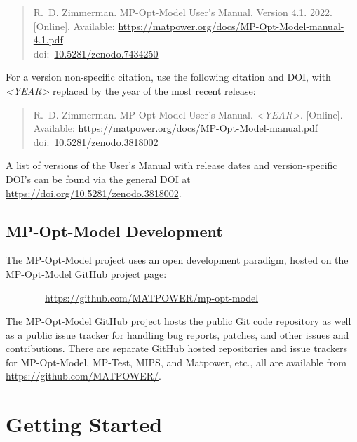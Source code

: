 \documentclass[12pt]{article}
\newcommand{\matpower}[0]{{\sc Matpower}}
\newcommand{\mptest}[0]{{MP-Test}}
\newcommand{\mips}[0]{{MIPS}}
\newcommand{\mpom}[0]{\mbox{MP-Opt-Model}}
\newcommand{\mpomurl}[0]{https://github.com/MATPOWER/mp-opt-model}
\newcommand{\mpomname}[0]{\mpom{}}
\newcommand{\doi}[1]{doi:~\href{https://doi.org/#1}{#1}}
\numberwithin{equation}{section}
\numberwithin{table}{section}
\numberwithin{figure}{section}
\begin{document}
\begin{quote}
\footnotesize
R.~D. Zimmerman. \mpomname{} User's Manual, Version 4.1. 2022. [Online]. Available: \url{https://matpower.org/docs/MP-Opt-Model-manual-4.1.pdf}\\
\doi{10.5281/zenodo.7434250}
\end{quote}
For a version non-specific citation, use the following citation and DOI,
with \emph{\textless{}YEAR\textgreater{}} replaced by the year of the most recent release:

\begin{quote}
\footnotesize
R.~D. Zimmerman. \mpomname{} User's Manual. \emph{\textless{}YEAR\textgreater{}}.
[Online]. Available: \url{https://matpower.org/docs/MP-Opt-Model-manual.pdf}\\
\doi{10.5281/zenodo.3818002}
\end{quote}
A list of versions of the User's Manual with release dates and
version-specific DOI's can be found via the general DOI at
\url{https://doi.org/10.5281/zenodo.3818002}.

\subsection{\mpom{} Development}
\label{sec:development}

The \mpom{} project uses an open development paradigm, hosted on the \mpom{} GitHub project page:

\bigskip

~~~~~~~~\url{\mpomurl}

\bigskip

The \mpom{} GitHub project hosts the public Git code repository as well as a public issue tracker for handling bug reports, patches, and other issues and contributions. There are separate GitHub hosted repositories and issue trackers for \mpom{}, \mptest{}, \mips{}, and \matpower{}, etc., all are available from \url{https://github.com/MATPOWER/}.


\clearpage
\section{Getting Started}

\end{document}
